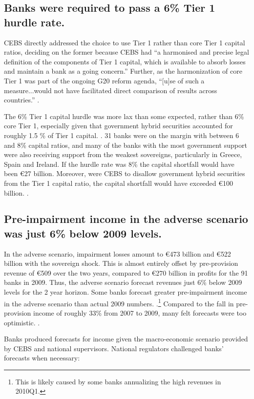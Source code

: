 \documentclass[12pt]{article}
\begin{document}
\subsection{Banks were required to pass a 6\% Tier 1 hurdle rate.}

CEBS directly addressed the choice to use Tier 1 rather than core Tier 1 capital ratios, deciding on the former because CEBS had ``a harmonised and precise legal definition of the components of Tier 1 capital, which is available to absorb losses and maintain a bank as a going concern.'' Further, as the harmonization of core Tier 1 was part of the ongoing G20 reform agenda, ``[u]se of such a measure...would not have facilitated direct comparison of results across countries.'' \citep{QA}.

The 6\% Tier 1 capital hurdle was more lax than some expected, rather than 6\% core Tier 1, especially given that government hybrid securities accounted for roughly 1.5 \% of Tier 1 capital. \citep{Gonzalez}. 31 banks were on the margin with between 6 and 8\% capital ratios, and many of the banks with the most government support were also receiving support from the weakest sovereigns, particularly in Greece, Spain and Ireland. If the hurdle rate was 8\% the capital shortfall would have been \euro{27} billion. Moreover, were CEBS to disallow government hybrid securities from the Tier 1 capital ratio, the capital shortfall would have exceeded \euro{100} billion. \citep{Deutsche}.

\subsection{Pre-impairment income in the adverse scenario was just 6\% below 2009 levels.}

In the adverse scenario, impairment losses amount to \euro{473} billion and \euro{522} billion with the sovereign shock. This is almost entirely offset by pre-provision revenue of \euro{509} over the two years, compared to \euro{270} billion in profits for the 91 banks in 2009. Thus, the adverse scenario forecast revenues just 6\% below 2009 levels for the 2 year horizon. Some banks forecast greater pre-impairment income in the adverse scenario than actual 2009 numbers. \citep{Deutsche}.\footnote{This is likely caused by some banks annualizing the high revenues in 2010Q1.} Compared to the fall in pre-provision income of roughly 33\% from 2007 to 2009, many felt forecasts were too optimistic. \citep{Samuels}.

Banks produced forecasts for income given the macro-economic scenario provided by CEBS and national supervisors. National regulators challenged banks' forecasts when necessary:
\end{document}
